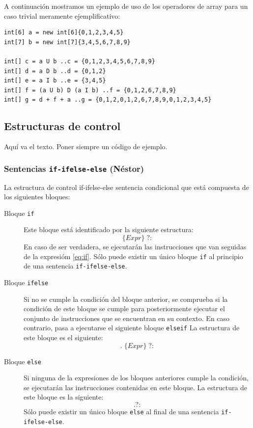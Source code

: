 \documentclass[11pt, english]{article}
\begin{document}
A continuación mostramos un ejemplo de uso de los operadores de array para un caso trivial meramente ejemplificativo:
\begin{lstlisting}[frame=single]
int[6] a = new int[6]{0,1,2,3,4,5}
int[7] b = new int[7]{3,4,5,6,7,8,9}

int[] c = a U b ..c = {0,1,2,3,4,5,6,7,8,9}
int[] d = a D b ..d = {0,1,2}
int[] e = a I b ..e = {3,4,5}
int[] f = (a U b) D (a I b) ..f = {0,1,2,6,7,8,9}
int[] g = d + f + a ..g = {0,1,2,0,1,2,6,7,8,9,0,1,2,3,4,5}
\end{lstlisting}
\newpage

\subsection{Estructuras de control}
Aquí va el texto. Poner siempre un código de ejemplo.

\subsubsection{Sentencias \texttt{if-ifelse-else} (Néstor)}
La estructura de control if-ifelse-else sentencia condicional que está compuesta de los siguientes bloques:
\begin{description}
	\item[Bloque \texttt{if}] Este bloque está identificado por la siguiente estructura:
	\begin{equation}\label{eq:if}
	\{Expr\}\;?:
	\end{equation}
	En caso de ser verdadera, se ejecutarán las instrucciones que van seguidas de la expresióm \ref{eq:if}. Sólo puede existir un único bloque \texttt{if} al principio de una sentencia \texttt{if-ifelse-else}.
	\item[Bloque \texttt{ifelse}] Si no se cumple la condición del bloque anterior, se comprueba si la condición de este bloque se cumple para posteriormente ejecutar el conjunto de instrucciones que se encuentran en su contexto. En caso contrario, pasa a ejecutarse el siguiente bloque \texttt{elseif} La estructura de este bloque es el siguiente:
	\begin{equation}\label{eq:if}
	.\;\{Expr\}\;?:
	\end{equation}
	\item[Bloque \texttt{else}] Si ninguna de la expresiones de los bloques anteriores cumple la condición, se ejecutarán las instrucciones contenidas en este bloque. La estructura de este bloque es la siguiente:
	\begin{equation}\label{eq:if}
	.?:
	\end{equation}
	Sólo puede existir un único bloque \texttt{else} al final de una sentencia \texttt{if-ifelse-else}.
\end{description}
\end{document}
